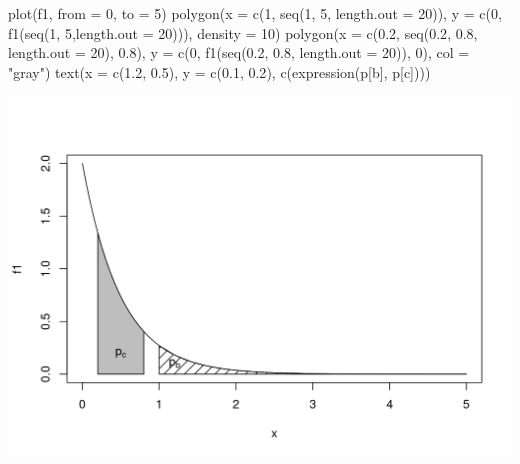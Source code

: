 \documentclass[
  10pt,
  a4paper]{book}
\newenvironment{Shaded}{\begin{snugshade}}{\end{snugshade}}
\newcommand{\AttributeTok}[1]{\textcolor[rgb]{0.77,0.63,0.00}{#1}}
\newcommand{\DecValTok}[1]{\textcolor[rgb]{0.00,0.00,0.81}{#1}}
\newcommand{\FloatTok}[1]{\textcolor[rgb]{0.00,0.00,0.81}{#1}}
\newcommand{\FunctionTok}[1]{\textcolor[rgb]{0.00,0.00,0.00}{#1}}
\newcommand{\NormalTok}[1]{#1}
\newcommand{\StringTok}[1]{\textcolor[rgb]{0.31,0.60,0.02}{#1}}
\begin{document}
\begin{Shaded}
\begin{Highlighting}[]
\FunctionTok{plot}\NormalTok{(f1, }\AttributeTok{from =} \DecValTok{0}\NormalTok{, }\AttributeTok{to =} \DecValTok{5}\NormalTok{)}
\FunctionTok{polygon}\NormalTok{(}\AttributeTok{x =} \FunctionTok{c}\NormalTok{(}\DecValTok{1}\NormalTok{, }\FunctionTok{seq}\NormalTok{(}\DecValTok{1}\NormalTok{, }\DecValTok{5}\NormalTok{, }\AttributeTok{length.out =} \DecValTok{20}\NormalTok{)),}
        \AttributeTok{y =} \FunctionTok{c}\NormalTok{(}\DecValTok{0}\NormalTok{, }\FunctionTok{f1}\NormalTok{(}\FunctionTok{seq}\NormalTok{(}\DecValTok{1}\NormalTok{, }\DecValTok{5}\NormalTok{,}\AttributeTok{length.out =} \DecValTok{20}\NormalTok{))),}
        \AttributeTok{density =} \DecValTok{10}\NormalTok{)}
\FunctionTok{polygon}\NormalTok{(}\AttributeTok{x =} \FunctionTok{c}\NormalTok{(}\FloatTok{0.2}\NormalTok{, }\FunctionTok{seq}\NormalTok{(}\FloatTok{0.2}\NormalTok{, }\FloatTok{0.8}\NormalTok{, }\AttributeTok{length.out =} \DecValTok{20}\NormalTok{), }\FloatTok{0.8}\NormalTok{),}
        \AttributeTok{y =} \FunctionTok{c}\NormalTok{(}\DecValTok{0}\NormalTok{, }\FunctionTok{f1}\NormalTok{(}\FunctionTok{seq}\NormalTok{(}\FloatTok{0.2}\NormalTok{, }\FloatTok{0.8}\NormalTok{, }\AttributeTok{length.out =} \DecValTok{20}\NormalTok{)), }\DecValTok{0}\NormalTok{),}
        \AttributeTok{col =} \StringTok{"gray"}\NormalTok{)}
\FunctionTok{text}\NormalTok{(}\AttributeTok{x =} \FunctionTok{c}\NormalTok{(}\FloatTok{1.2}\NormalTok{, }\FloatTok{0.5}\NormalTok{), }\AttributeTok{y =} \FunctionTok{c}\NormalTok{(}\FloatTok{0.1}\NormalTok{, }\FloatTok{0.2}\NormalTok{),}
     \FunctionTok{c}\NormalTok{(}\FunctionTok{expression}\NormalTok{(p[b], p[c])))}
\end{Highlighting}
\end{Shaded}

\begin{center}\includegraphics{figures/unnamed-chunk-329-1} \end{center}
\end{document}
